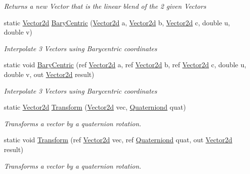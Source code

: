 \begin{DoxyCompactItemize}
\begin{DoxyCompactList}\small\item\em Returns a new Vector that is the linear blend of the 2 given Vectors \end{DoxyCompactList}\item 
static \hyperlink{struct_open_t_k_1_1_vector2d}{Vector2d} \hyperlink{struct_open_t_k_1_1_vector2d_a5f4cb45a17f9e62a4b3dfdffb1bf6058}{Bary\-Centric} (\hyperlink{struct_open_t_k_1_1_vector2d}{Vector2d} a, \hyperlink{struct_open_t_k_1_1_vector2d}{Vector2d} b, \hyperlink{struct_open_t_k_1_1_vector2d}{Vector2d} c, double u, double v)
\begin{DoxyCompactList}\small\item\em Interpolate 3 Vectors using Barycentric coordinates \end{DoxyCompactList}\item 
static void \hyperlink{struct_open_t_k_1_1_vector2d_af3d32ab76d0f6cf85248d79608858a19}{Bary\-Centric} (ref \hyperlink{struct_open_t_k_1_1_vector2d}{Vector2d} a, ref \hyperlink{struct_open_t_k_1_1_vector2d}{Vector2d} b, ref \hyperlink{struct_open_t_k_1_1_vector2d}{Vector2d} c, double u, double v, out \hyperlink{struct_open_t_k_1_1_vector2d}{Vector2d} result)
\begin{DoxyCompactList}\small\item\em Interpolate 3 Vectors using Barycentric coordinates\end{DoxyCompactList}\item 
static \hyperlink{struct_open_t_k_1_1_vector2d}{Vector2d} \hyperlink{struct_open_t_k_1_1_vector2d_a4b77f6d5ddd6dcb88bb9be38c838ddb1}{Transform} (\hyperlink{struct_open_t_k_1_1_vector2d}{Vector2d} vec, \hyperlink{struct_open_t_k_1_1_quaterniond}{Quaterniond} quat)
\begin{DoxyCompactList}\small\item\em Transforms a vector by a quaternion rotation. \end{DoxyCompactList}\item 
static void \hyperlink{struct_open_t_k_1_1_vector2d_a0f888c6ed5e9fe810341214004607a2a}{Transform} (ref \hyperlink{struct_open_t_k_1_1_vector2d}{Vector2d} vec, ref \hyperlink{struct_open_t_k_1_1_quaterniond}{Quaterniond} quat, out \hyperlink{struct_open_t_k_1_1_vector2d}{Vector2d} result)
\begin{DoxyCompactList}\small\item\em Transforms a vector by a quaternion rotation. \end{DoxyCompactList}\item 

\end{DoxyCompactItemize}
